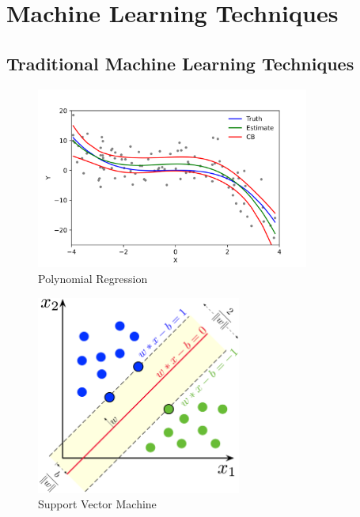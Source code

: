 \section{Machine Learning Techniques}
\label{sec:ml-techniques}
\subsection{Traditional Machine Learning Techniques}
\label{subsec:concepts-traditional-techniques}
\begin{frame}{\insertsubsection}
    \begin{figure}
        \centering
        \includegraphics[width=0.8\textwidth]{media/Polyreg_scheffe.png}
        \caption{Polynomial Regression~\cite{Skbkekas2009}}
    \end{figure}
\end{frame}
%
%
\begin{frame}{\insertsubsection}
    \begin{figure}
        \centering
        \includegraphics[width=0.6\textwidth]{media/SVM_margin.png}
        \caption{Support Vector Machine~\cite{Larhmam2018}}
    \end{figure}
\end{frame}
